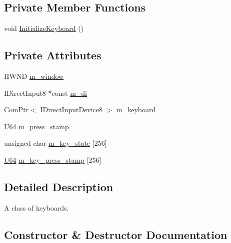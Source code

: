 \subsection*{Private Member Functions}
\begin{DoxyCompactItemize}
\item 
void \hyperlink{classmage_1_1_keyboard_af7aea666e38e5d91ad6bfee2124819a3}{Initialize\+Keyboard} ()
\end{DoxyCompactItemize}
\subsection*{Private Attributes}
\begin{DoxyCompactItemize}
\item 
H\+W\+ND \hyperlink{classmage_1_1_keyboard_a6be21d99a0678df71f963506dcccc340}{m\+\_\+window}
\item 
I\+Direct\+Input8 $\ast$const \hyperlink{classmage_1_1_keyboard_a627eeef05bae81a60c2c44fd039ff7f8}{m\+\_\+di}
\item 
\hyperlink{namespacemage_ae74f374780900893caa5555d1031fd79}{Com\+Ptr}$<$ I\+Direct\+Input\+Device8 $>$ \hyperlink{classmage_1_1_keyboard_a992b8b8caf0d858163e5e9af04302324}{m\+\_\+keyboard}
\item 
\hyperlink{namespacemage_a6672cf3c861707ce4a3235a3eb43941d}{U64} \hyperlink{classmage_1_1_keyboard_a075349dbce5145f46146ccdfea78214a}{m\+\_\+press\+\_\+stamp}
\item 
unsigned char \hyperlink{classmage_1_1_keyboard_a7499df459499f5addd50507ea1e2358c}{m\+\_\+key\+\_\+state} \mbox{[}256\mbox{]}
\item 
\hyperlink{namespacemage_a6672cf3c861707ce4a3235a3eb43941d}{U64} \hyperlink{classmage_1_1_keyboard_a4a9e80f99dfea8ac518fb451965d4047}{m\+\_\+key\+\_\+press\+\_\+stamp} \mbox{[}256\mbox{]}
\end{DoxyCompactItemize}


\subsection{Detailed Description}
A class of keyboards. 

\subsection{Constructor \& Destructor Documentation}
\hypertarget{classmage_1_1_keyboard_ac656f6a3272d07c2897aa383051f0fb8}{}\label{classmage_1_1_keyboard_ac656f6a3272d07c2897aa383051f0fb8} 
